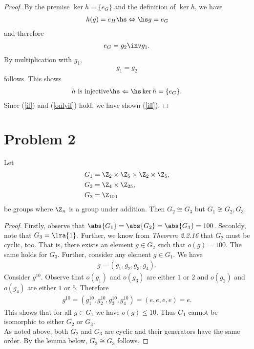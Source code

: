 \documentclass{article}
\begin{document}
\begin{proof}
	By the premise $\ker h = \{e_G\}$ and the definition of $\ker h$,
	we have
	\begin{align*}
		h(g) = e_H \hs\Leftrightarrow\hs g=e_G
	\end{align*}
	and therefore
	\begin{align*}
		e_G = g_2\inv g_1.
	\end{align*}
	By multiplication with $g_1$,
	\begin{align*}
		g_1 = g_2
	\end{align*}
	follows. This shows
	\begin{align}
		\label{onlyif}
		h\text{ is injective}\hs\Leftarrow\hs \ker h = \{e_G\}.
	\end{align}
	Since (\ref{if}) and (\ref{onlyif}) hold, we have shown (\ref{iff}).
\end{proof}

\section*{Problem 2}


\begin{claim*}
	Let
	\begin{align*}
		G_1 & = \Z_2 \times \Z_5 \times \Z_2 \times \Z_5, \\
		G_2 & = \Z_4 \times \Z_{25},                      \\
		G_3 & = \Z_{100}
	\end{align*}
	be groups where $\Z_n$ is a group under addition. Then
	$G_2 \cong G_3$ but $G_1\not\cong G_2,G_3$.
\end{claim*}

\begin{proof}
	Firstly, observe that $\abs{G_1}=\abs{G_2}=\abs{G_3}=100$.
	Seconldy, note that $G_3=\lra{1}$. Further, we know from
	\emph{Theorem 2.2.16} that $G_2$ must be cyclic, too. That is,
	there exists an element $g\in G_2$ such that $o(g)=100$. The
	same holds for $G_3$. Further, consider any element $g\in G_1$.
	We have
	\begin{align*}
		g = (g_1, g_2, g_3, g_4).
	\end{align*}
	Consider $g^{10}$. Observe that $o(g_1)$ and $o(g_3)$ are either
	$1$ or $2$ and $o(g_2)$ and $o(g_4)$ are either $1$ or $5$. Therefore
	\begin{align*}
		g^{10}=(g_1^{10},g_2^{10},g_3^{10},g_4^{10})=(e,e,e,e)=e.
	\end{align*}
	This shows that for all $g\in G_1$ we have $o(g)\leq 10$. Thus
	$G_1$ cannot be isomorphic to either $G_2$ or $G_3$.\\
	\indent As noted above, both $G_2$ and $G_3$ are cyclic and their
	generators have the same order. By the lemma below, $G_2\cong G_3$
	follows.
\end{proof}
\end{document}
